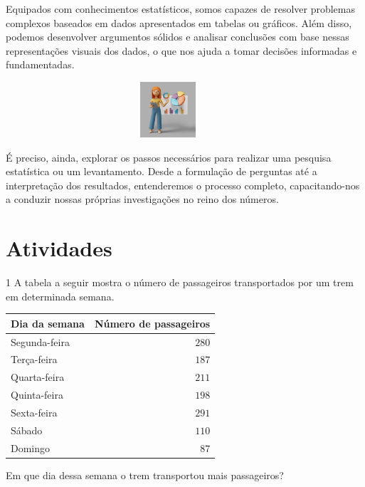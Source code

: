 {Equipados com conhecimentos estatísticos, somos capazes de resolver problemas
complexos baseados em dados apresentados em tabelas ou gráficos. Além disso,
podemos desenvolver argumentos sólidos e analisar conclusões com base nessas
representações visuais dos dados, o que nos ajuda a tomar decisões informadas e
fundamentadas.

\begin{figure}[H]
\centering\includegraphics[width=3.92708in,height=0.8125in]{./imgSAEB_6_MAT/media/image136.png}
\end{figure}

É preciso, ainda, explorar os passos necessários para realizar uma pesquisa
estatística ou um levantamento. Desde a formulação de perguntas até a
interpretação dos resultados, entenderemos o processo completo,
capacitando-nos a conduzir nossas próprias investigações no reino dos números.}

\section*{Atividades}

\num{1}  A tabela a seguir mostra o número de passageiros transportados por um
trem em determinada semana.

\begin{table}[H]\centering
\begin{tabular}[]{lr}
\toprule
Dia da semana & Número de passageiros\\
\midrule
Segunda-feira & $280$\\
Terça-feira & $187$\\
Quarta-feira & $211$\\
Quinta-feira & $198$\\
Sexta-feira & $291$\\
Sábado & $110$\\
Domingo & $87$\\
\bottomrule
\end{tabular}
\end{table}

Em que dia dessa semana o trem transportou mais passageiros?



